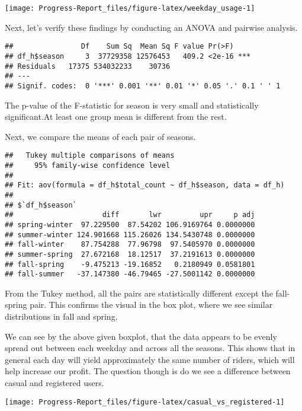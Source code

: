 \documentclass[
]{article}
\begin{document}
\begin{center}\texttt{[image: Progress-Report\_files/figure-latex/weekday\_usage-1]} \end{center}

Next, let's verify these findings by conducting an ANOVA and pairwise
analysis.

\begin{verbatim}
##                Df    Sum Sq  Mean Sq F value Pr(>F)    
## df_h$season     3  37729358 12576453   409.2 <2e-16 ***
## Residuals   17375 534032233    30736                   
## ---
## Signif. codes:  0 '***' 0.001 '**' 0.01 '*' 0.05 '.' 0.1 ' ' 1
\end{verbatim}

The p-value of the F-statistic for season is very small and
statistically significant.At least one group mean is different from the
rest.

Next, we compare the means of each pair of seasons.

\begin{verbatim}
##   Tukey multiple comparisons of means
##     95% family-wise confidence level
## 
## Fit: aov(formula = df_h$total_count ~ df_h$season, data = df_h)
## 
## $`df_h$season`
##                     diff       lwr         upr     p adj
## spring-winter  97.229500  87.54202 106.9169764 0.0000000
## summer-winter 124.901668 115.26026 134.5430748 0.0000000
## fall-winter    87.754288  77.96798  97.5405970 0.0000000
## summer-spring  27.672168  18.12517  37.2191613 0.0000000
## fall-spring    -9.475213 -19.16852   0.2180949 0.0581801
## fall-summer   -37.147380 -46.79465 -27.5001142 0.0000000
\end{verbatim}

From the Tukey method, all the pairs are statistically different except
the fall-spring pair. This confirms the visual in the box plot, where we
see similar distributions in fall and spring.

We can see by the above given boxplot, that the data appears to be
evenly spread out between each weekday and across all the seasons. This
shows that in general each day will yield approximately the same number
of riders, which will help increase our profit. The question though is
do we see a difference between casual and registered users.

\begin{center}\texttt{[image: Progress-Report\_files/figure-latex/casual\_vs\_registered-1]} \end{center}
\end{document}
